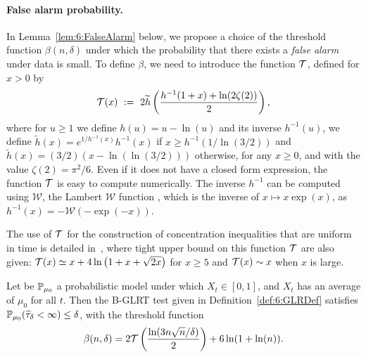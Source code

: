 \paragraph{False alarm probability.}\label{par:6:falseAlarm}

In Lemma~\ref{lem:6:FalseAlarm} below, we propose a choice of the threshold function $\beta(n,\delta)$ under which the probability that there exists a \emph{false alarm} under \iid{} data is small. To define $\beta$, we need to introduce the function $\mathcal{T}$, defined for $x>0$ by
%
\begin{equation}\label{def:6:function_T}
    \mathcal{T}(x) ~:=~ 2 \widetilde{h}\left(\frac{h^{-1}(1+x) + \ln(2\zeta(2))}{2}\right),
\end{equation}
where for $u \ge 1$ we define $h(u) = u - \ln(u)$ and its inverse $h^{-1}(u)$,
%
we define $\widetilde{h}(x) = e^{1/h^{-1}(x)} h^{-1}(x)$ if $x \ge h^{-1}(1/\ln (3/2))$ and $\tilde{h}(x) = (3/2) (x-\ln(\ln (3/2)))$ otherwise, for any $x \ge 0$,
and with the value $\zeta(2) = \pi^2 / 6$.
%
Even if it does not have a closed form expression, the function $\mathcal{T}$ is easy to compute numerically.
%
The inverse $h^{-1}$ can be computed using $\mathcal{W}$, the Lambert $\mathcal{W}$ function \cite{Corless96}, which is the inverse of $x \mapsto x \exp(x)$, as $h^{-1}(x) = - \mathcal{W}(- \exp(-x))$.

The use of $\mathcal{T}$ for the construction of concentration inequalities that are uniform in time is detailed in~\cite{KK18Martingales}, where tight upper bound on this function $\mathcal{T}$ are also given:
$\mathcal{T} (x) \simeq x + 4 \ln\big(1 + x + \sqrt{2x}\big)$ for $x\geq 5$ and $\mathcal{T}(x) \sim x$ when $x$ is large.

\begin{lemma}\label{lem:6:FalseAlarm}
    Let be $\mathbb{P}_{\mu_0}$ a probabilistic model under which $X_t \in [0,1]$, and $X_t$ has an average of $\mu_0$ for all $t$.
    Then the B-GLRT test given in Definition~\ref{def:6:GLRDef} satisfies
    $\mathbb{P}_{\mu_0}(\widehat{\tau}_\delta < \infty) \leq \delta$, with the threshold function
    \begin{equation}\label{def:6:beta}
        \beta(n,\delta) = 2\mathcal{T}\left(\frac{\ln(3n\sqrt{n}/\delta)}{2}\right) + 6\ln(1+\ln(n)).
    \end{equation}
\end{lemma}

